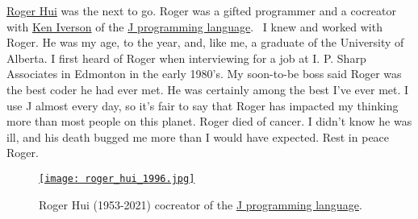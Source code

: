 
\href{https://rogerhui.rip/}{Roger Hui} was the next to go. Roger was a
gifted programmer and a cocreator with
\href{https://en.wikipedia.org/wiki/Kenneth_E._Iverson}{Ken Iverson} of
the \href{https://www.jsoftware.com/\#/}{J programming language}.~ I
knew and worked with Roger. He was my age, to the year, and, like me, a
graduate of the University of Alberta. I first heard of Roger when
interviewing for a job at I. P. Sharp Associates in Edmonton in the
early 1980's. My soon-to-be boss said Roger was the best coder he had
ever met. He was certainly among the best I've ever met. I use J almost
every day, so it's fair to say that Roger has impacted my thinking more
than most people on this planet. Roger died of cancer. I didn't know he
was ill, and his death bugged me more than I would have expected. Rest
in peace Roger.


\begin{SCfigure}[2]
\centering
\href{https://bakerjd99.files.wordpress.com/2022/01/roger_hui_1996.jpg}{\texttt{[image: roger\_hui\_1996.jpg]}}
\caption{Roger Hui (1953-2021) cocreator of the \href{https://www.jsoftware.com}{J programming language}.}
\label{fig:7274x1}
\end{SCfigure}


